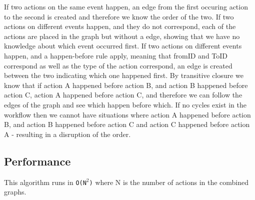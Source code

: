 \newpar If two actions on the same event happen, an edge from the first occuring action to the second is created and therefore we know the order of the two. 
If two actions on different events happen, and they do not correspond, each of the actions are placed in the graph but without a edge, showing that we have no knowledge about which event occurred first.
If two actions on different events happen, and a happen-before rule apply, meaning that fromID and ToID correspond as well as the type of the action correspond, an edge is created between the two indicating which one happened first. 
By transitive closure we know that if action A happened before action B, and action B happened before action C, action A happened before action C, and therefore we can follow the edges of the graph and see which happen before which.
If no cycles exist in the workflow then we cannot have situations where action A happened before action B, and action B happened before action C and action C happened before action A - resulting in a disruption of the order. %

\subsection{Performance} %
This algorithm runs in \texttt{O(N$^2$)} where N is the number of actions in the combined graphs.

